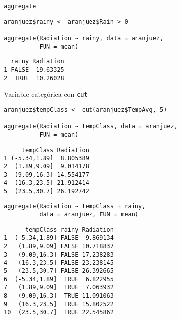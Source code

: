 \documentclass[xcolor={usenames,svgnames,dvipsnames}]{beamer}
\begin{document}
\begin{frame}[fragile,label={sec:org7ae741c}]{\texttt{aggregate}}
 \lstset{language=r,label= ,caption= ,captionpos=b,numbers=none}
\begin{lstlisting}
aranjuez$rainy <- aranjuez$Rain > 0

aggregate(Radiation ~ rainy, data = aranjuez,
          FUN = mean)
\end{lstlisting}

\begin{verbatim}
  rainy Radiation
1 FALSE  19.63325
2  TRUE  10.26028
\end{verbatim}
\end{frame}

\begin{frame}[fragile,label={sec:orgb37d094}]{Variable categórica con \texttt{cut}}
 \lstset{language=r,label= ,caption= ,captionpos=b,numbers=none}
\begin{lstlisting}
aranjuez$tempClass <- cut(aranjuez$TempAvg, 5)

aggregate(Radiation ~ tempClass, data = aranjuez,
          FUN = mean)
\end{lstlisting}

\begin{verbatim}
     tempClass Radiation
1 (-5.34,1.89]  8.805389
2  (1.89,9.09]  9.014178
3  (9.09,16.3] 14.554177
4  (16.3,23.5] 21.912414
5  (23.5,30.7] 26.192742
\end{verbatim}

\lstset{language=r,label= ,caption= ,captionpos=b,numbers=none}
\begin{lstlisting}
aggregate(Radiation ~ tempClass + rainy,
          data = aranjuez, FUN = mean)
\end{lstlisting}

\begin{verbatim}
      tempClass rainy Radiation
1  (-5.34,1.89] FALSE  9.869134
2   (1.89,9.09] FALSE 10.718837
3   (9.09,16.3] FALSE 17.238283
4   (16.3,23.5] FALSE 23.238145
5   (23.5,30.7] FALSE 26.392665
6  (-5.34,1.89]  TRUE  6.822955
7   (1.89,9.09]  TRUE  7.063932
8   (9.09,16.3]  TRUE 11.091063
9   (16.3,23.5]  TRUE 15.802522
10  (23.5,30.7]  TRUE 22.545862
\end{verbatim}
\end{frame}
\end{document}
